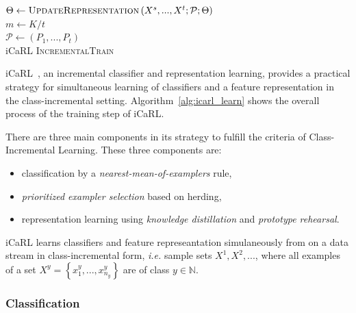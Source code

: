 \begin{algorithm}[ht]
  $\Theta \leftarrow \textsc{UpdateRepresentation}\left(X^s, ..., X^t;\mathcal{P};\Theta\right)$ \\
  $m \leftarrow K/t$  \\
  $\mathcal{P} \leftarrow \left(P_1, ..., P_t\right)$  \\
\caption{ iCaRL \textsc{IncrementalTrain} \label{alg:icarl_learn}}
\end{algorithm}


iCaRL~\cite{Rebuffi:2016aa}, an incremental classifier and representation learning, provides a practical strategy for simultaneous learning of classifiers and a feature representation in the class-incremental setting. Algorithm~\ref{alg:icarl_learn} shows the overall process of the training step of iCaRL.

There are three main components in its strategy to fulfill the criteria of Class-Incremental Learning. These three components are:

\begin{itemize}
  \item classification by a \textit{nearest-mean-of-examplers} rule,
  \item \textit{prioritized exampler selection} based on herding,
  \item representation learning using \textit{knowledge distillation} and \textit{prototype rehearsal}.
\end{itemize}

iCaRL learns classifiers and feature represeantation simulaneously from on a data stream in class-incremental form, \textit{i.e.} sample sets $X^1, X^2, ...$, where all examples of a set $X^y = \left\{ x_1^y, ..., x_{n_y}^y \right\}$ are of class $y \in \mathbb{N}$.

\subsubsection{Classification}
\label{sec:icarl_classification}


